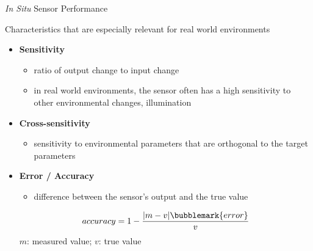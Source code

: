 \documentclass[compress]{beamer}
\begin{document}
\begin{frame}{\emph{In Situ} Sensor Performance}

    Characteristics that are especially relevant for real
    world environments

    \begin{itemize}
        \item {\bf Sensitivity}

              \begin{itemize}

                  \item
                        ratio of output change to input change
                  \item
                        in real world environments, the sensor often has a high sensitivity to
                        other environmental changes, \eg illumination
              \end{itemize}

        \item {\bf Cross-sensitivity}

              \begin{itemize}

                  \item
                        sensitivity to environmental parameters that are orthogonal to the
                        target parameters
              \end{itemize}

        \item {\bf Error / Accuracy}

              \begin{itemize}

                  \item
                        difference between the sensor's output and the true value
              \end{itemize}
              \[
                  accuracy =  1 - \frac{|m-v|\bubblemark{error}}{v}
              \]
              $m$: measured value; $v$: true value
    \end{itemize}
\end{frame}
\end{document}

